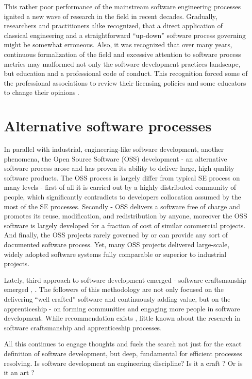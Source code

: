 This rather poor performance of the mainstream software engineering processes 
ignited a new wave of research in the field in recent decades. Gradually, researchers and 
practitioners alike recognized, that a direct application of classical engineering and a 
straightforward ``up-down'' software process governing might be somewhat erroneous. 
Also, it was recognized that over many years, continuous formalization of the field and 
excessive attention to software process metrics may malformed not only the software development 
practices landscape, but education and a professional code of conduct. 
This recognition forced some of the professional associations to review their licensing policies 
\cite{citeulike:11045517} and some educators to change their opinions \cite{citeulike:5203446}. 

\section{Alternative software processes}
In parallel with industrial, engineering-like software development, another phenomena, 
the Open Source Software (OSS) development - an alternative software process arose and has proven its ability to deliver 
large, high quality software products. The OSS process is largely differ from typical SE process
on many levels - first of all it is carried out by a highly distributed community of people,
which significantly contradicts to developers collocation assumed by the most of the SE processes.
Secondly - OSS delivers a software free of charge and promotes its reuse, modification, and 
redistribution by anyone, moreover the OSS software is largely developed for a fraction of cost
of similar commercial projects. And finally, the OSS projects rarely governed by or can provide
any sort of documented software process. Yet, many OSS projects delivered large-scale, widely
adopted software systems fully comparable or superior to industrial projects.

Lately, third approach to software development emerged - software craftsmanship emerged 
\cite{citeulike:11058561}, \cite{citeulike:11058554}. The followers of this methodology 
are not only focused on the delivering ``well crafted'' software and continuously adding value,
but on the apprenticeship - on forming communities and engaging more people in software development.
While recommendation exists \cite{citeulike:11058784}, little known about the research 
in software craftsmanship and apprenticeship processes.

All this continues to engage thoughts and fuels the search not just for the exact definition 
of software development, but deep, fundamental for efficient processes resolving. 
Is software development an engineering discipline? Is it a craft \cite{citeulike:5203446}? 
Or is it an art \cite{citeulike:11045694}?

